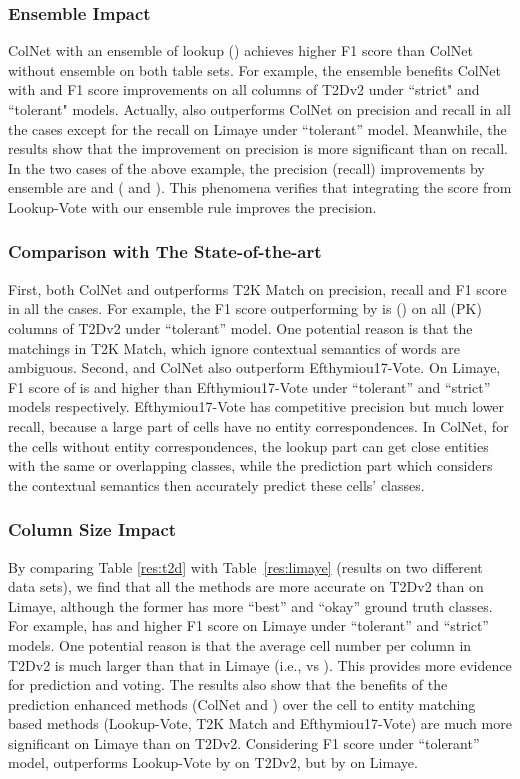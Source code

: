 \documentclass[letterpaper]{article}
\newcommand{\rv}[1]{{\color{black}#1}}
\newcommand{\camera}[1]{{\color{black}#1}}
\newcommand{\ColNet}{\textsf{ColNet}\xspace}
\begin{document}
\subsubsection{Ensemble Impact}
\ColNet with an ensemble of lookup \rv{() achieves higher F1 score than \ColNet without ensemble on both table sets.
For example, the ensemble benefits \ColNet with  and } F1 score improvements on all columns of T2Dv2 under ``strict" and ``tolerant" models.
\rv{Actually,  also outperforms \ColNet on precision and recall in all the cases except for the recall on Limaye under ``tolerant'' model.}
\rv{Meanwhile, the results show that the improvement on precision is more significant than on recall.
In the two cases of the above example, 
the precision (recall)  improvements by ensemble are  and  ( and ).
This phenomena verifies that integrating the score from Lookup-Vote with our ensemble rule improves the precision.}


\subsubsection{Comparison with \rv{The State-of-the-art}}
\rv{
First, both \ColNet and  outperforms T2K Match on precision, recall and F1 score in all the cases.
For example, the F1 score outperforming by  is  () on all (PK) columns of T2Dv2 under ``tolerant'' model.
One potential reason is that the matchings in T2K Match, which ignore contextual semantics of words are ambiguous.
}
\rv{Second,  and \ColNet also outperform Efthymiou17-Vote.}
On Limaye,
F1 score of  is  and  higher than Efthymiou17-Vote under ``tolerant''  and ``strict'' models respectively.
Efthymiou17-Vote has competitive precision but much lower recall,
because a large part of cells have no entity correspondences.
\rv{In \ColNet, for the cells without entity correspondences, the lookup part can get close entities with the same or overlapping classes,
while the prediction part which considers the contextual semantics then accurately predict these cells' classes. }

\subsubsection{Column Size Impact}
By comparing Table \ref{res:t2d} with Table~\ref{res:limaye} \camera{(results on two different data sets)},
we \camera{find that} all the methods are more accurate on T2Dv2 than on Limaye,
although the former has more ``best'' and ``okay'' ground truth classes.
For example,
 has \rv{ and } higher F1 score on Limaye under ``tolerant'' and ``strict'' models.
One potential reason is that the average cell number per column in T2Dv2 
is much larger than that in Limaye (i.e.,  vs ).
\camera{This} provides more evidence for prediction and voting. 
\rv{The results also show that the 
\camera{benefits}
of the prediction enhanced methods (\ColNet and ) over the cell to entity matching based methods (Lookup-Vote, T2K Match and Efthymiou17-Vote) \camera{are} much more significant on Limaye than on T2Dv2. 
Considering F1 score under ``tolerant'' model, 
 outperforms Lookup-Vote by   on T2Dv2, but by  on Limaye.
}
\end{document}
